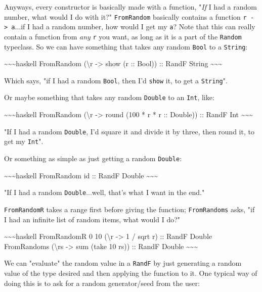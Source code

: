 \documentclass[]{article}
\begin{document}
Anyways, every constructor is basically made with a function, "\emph{If} I had a
random number, what would I do with it?" \texttt{FromRandom} basically contains
a function \texttt{r\ -\textgreater{}\ a}...if I had a random number, how would
I get my \texttt{a}? Note that this can really contain a function from
\emph{any} \texttt{r} you want, as long as it is a part of the \texttt{Random}
typeclass. So we can have something that takes any random \texttt{Bool} to a
\texttt{String}:

\textasciitilde{}\textasciitilde{}\textasciitilde{}haskell FromRandom
(\textbackslash{}r -\textgreater{} show (r :: Bool)) :: RandF String
\textasciitilde{}\textasciitilde{}\textasciitilde{}

Which says, "if I had a random \texttt{Bool}, then I'd \texttt{show} it, to get
a \texttt{String}".

Or maybe something that takes any random \texttt{Double} to an \texttt{Int},
like:

\textasciitilde{}\textasciitilde{}\textasciitilde{}haskell FromRandom
(\textbackslash{}r -\textgreater{} round (100 * r * r :: Double)) :: RandF Int
\textasciitilde{}\textasciitilde{}\textasciitilde{}

"If I had a random \texttt{Double}, I'd square it and divide it by three, then
round it, to get my \texttt{Int}".

Or something as simple as just getting a random \texttt{Double}:

\textasciitilde{}\textasciitilde{}\textasciitilde{}haskell FromRandom id ::
RandF Double \textasciitilde{}\textasciitilde{}\textasciitilde{}

"If I had a random \texttt{Double}...well, that's what I want in the end."

\texttt{FromRandomR} takes a range first before giving the function;
\texttt{FromRandoms} asks, "if I had an infinite list of random items, what
would I do?"

\textasciitilde{}\textasciitilde{}\textasciitilde{}haskell FromRandomR 0 10
(\textbackslash{}r -\textgreater{} 1 / sqrt r) :: RandF Double FromRandoms
(\textbackslash{}rs -\textgreater{} sum (take 10 rs)) :: RandF Double
\textasciitilde{}\textasciitilde{}\textasciitilde{}

We can "evaluate" the random value in a \texttt{RandF} by just generating a
random value of the type desired and then applying the function to it. One
typical way of doing this is to ask for a random generator/seed from the user:
\end{document}
